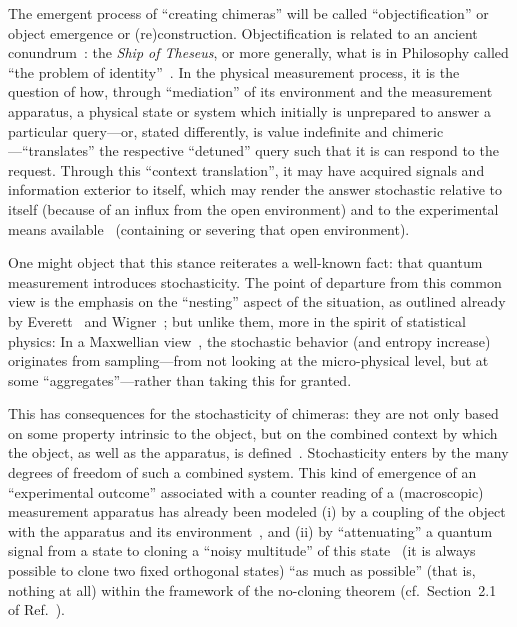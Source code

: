 \documentclass[entropy,article,accept,oneauthor,pdftex]{Definitions/mdpi}
\begin{document}
The emergent process of ``creating chimeras'' will be called ``objectification'' or object emergence or (re)construction.
Objectification is related to an ancient conundrum~\cite{Yanofsky-object}:
the {\it Ship of Theseus}, or more generally, what is in Philosophy called ``the problem of identity''~\cite{Gallois-SEP,Gallois-POI}.
In the physical measurement process, it is the question of how, through ``mediation'' of its environment and the measurement apparatus,
a physical state or system which initially is unprepared to answer a particular query---or,
stated differently, is value indefinite and
chimeric---``translates'' the respective ``detuned'' query such that it is can respond to the request.
Through this ``context translation'', it may have acquired signals and information exterior to itself,
which may render the answer stochastic relative to itself (because of an influx from the open environment)
and to the experimental means available~\cite{svozil-2003-garda,svozil-2013-omelette} (containing or severing that open environment).

One might object that this stance reiterates a well-known fact: that quantum measurement introduces stochasticity.
The point of departure from this common view is the emphasis on the ``nesting'' aspect of the situation,
as outlined already by Everett~\cite{everett} and Wigner~\cite{wigner:mb}; but unlike them, more in the spirit of statistical physics:
In a Maxwellian view~\cite{Myrvold2011237},
the stochastic behavior (and entropy increase) originates from sampling---from not looking at the micro-physical level, but at some
``aggregates''---rather than taking this for granted.


This has consequences for the stochasticity of chimeras:
they are not only based on some property intrinsic to the object, but on the combined context by which
the object, as well as the apparatus, is defined~\cite{bohr-1949}.
Stochasticity enters by the many degrees of freedom of such a combined system.
This kind of emergence of an ``experimental outcome'' associated with a counter reading of a (macroscopic) measurement apparatus has already been modeled
(i)
by a coupling of the object with the apparatus and its environment~\cite{Verrucchi-18},
and
(ii)
by ``attenuating'' a quantum signal from a state to cloning a ``noisy multitude'' of this state~\cite{glauber-collected-cat,Glauber-cat-86} (it is always possible to clone two fixed orthogonal states)
``as much as possible'' (that is, nothing at all) within the framework of the no-cloning theorem (cf.~Section~2.1 of Ref.~\cite{mermin-07}).
\end{document}
